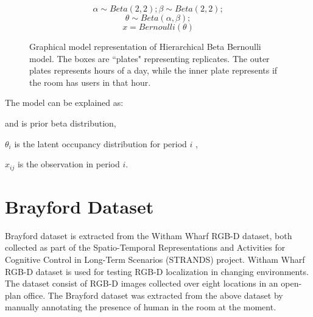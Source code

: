 \noindent
\begin{figure}[htp]

\begin{minipage}{0.3\textwidth}
\centering


\end{minipage}%
\begin{minipage}{0.7\textwidth}

\begin{equation*}
	\alpha \sim Beta(2,2) ; \beta \sim Beta(2, 2);
\end{equation*}
\begin{equation*}
	\theta \sim Beta(\alpha, \beta);
\end{equation*}
\begin{equation*}
	x = Bernoulli(\theta)
\end{equation*}
\end{minipage}
\caption[Hierarchical Beta Bernoulli graphical model]{Graphical model representation of Hierarchical Beta Bernoulli model. The boxes are ``plates" representing replicates. The outer plates represents hours of a day, while the inner plate represents if the room has users in that hour.}
\label{bbm2}
\end{figure}



The model can be explained as:

	\boldmath{$\alpha$} and \boldmath{$\beta$} is  prior beta distribution, 
	
	$\theta_i$ is the latent occupancy distribution for period $i$  ,
	
	$x_{ij}$ is the observation in period $i$.

\section{Brayford Dataset}

Brayford dataset is extracted from the Witham Wharf RGB-D dataset, both collected as part of the Spatio-Temporal Representations and Activities for Cognitive Control in Long-Term Scenarios (STRANDS) project. 
Witham Wharf RGB-D dataset is used for testing RGB-D localization in changing environments. The dataset consist of RGB-D images collected over eight locations in an open-plan office. The Brayford dataset was extracted from the above dataset by manually annotating the presence of human in the room at the moment.

